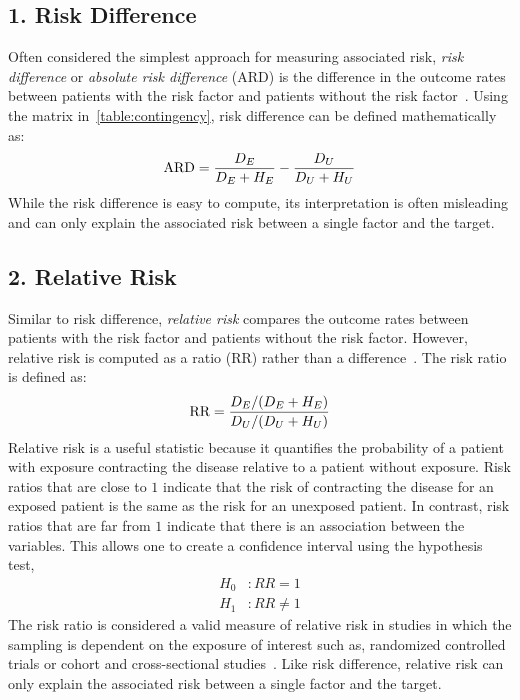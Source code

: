 \subsection{1. Risk Difference}\label{subsec:associated-risk-difference}
Often considered the simplest approach for measuring associated risk, \emph{risk difference} or \emph{absolute risk difference} (ARD) is the difference in the outcome rates between patients with the risk factor and patients without the risk factor~\citep{Statistical-hypothesis-testing}.
Using the matrix in~\ref{table:contingency}, risk difference can be defined mathematically as:
\begin{align*}
 \text{ARD} = \frac{D_{E}}{D_{E} + H_{E}} - \frac{D_{U}}{D_{U} + H_{U}}
\end{align*}
While the risk difference is easy to compute, its interpretation is often misleading and can only explain the associated risk between a single factor and the target.

\subsection{2. Relative Risk}\label{subsec:relative-risk}
Similar to risk difference, \emph{relative risk} compares the outcome rates between patients with the risk factor and patients without the risk factor.
However, relative risk is computed as a ratio (RR) rather than a difference~\citep{Statistical-hypothesis-testing}.
The risk ratio is defined as:
\begin{align*}
 \text{RR} = \frac{D_{E} / (D_{E} + H_{E})}{D_{U} / (D_{U} + H_{U})}
\end{align*}
Relative risk is a useful statistic because it quantifies the probability of a patient with exposure contracting the disease relative to a patient without exposure.
Risk ratios that are close to $1$ indicate that the risk of contracting the disease for an exposed patient is the same as the risk for an unexposed patient.
In contrast, risk ratios that are far from $1$ indicate that there is an association between the variables.
This allows one to create a confidence interval using the hypothesis test,
\begin{align*}
    H_0&: RR = 1 \\
    H_1&: RR \neq 1
\end{align*}
The risk ratio is considered a valid measure of relative risk in studies in which the sampling is dependent on the exposure of interest such as, randomized controlled trials or cohort and cross-sectional studies~\citep{Relative-Measures-of-Association-for-Binary-Outcomes}.
Like risk difference, relative risk can only explain the associated risk between a single factor and the target.


